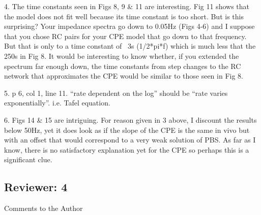 \documentclass[journal, a4paper]{IEEEtran}
\begin{document}
{    4. The time constants seen in Figs 8, 9 \& 11 are interesting. Fig 11 shows that the model does not fit well because its time constant is too short. But is this surprising? Your impedance spectra go down to 0.05Hz (Figs 4-6) and I suppose that you chose RC pairs for your CPE model that go down to that frequency. But that is only to a time constant of ~3s (1/2*pi*f) which is much less that the 250s in Fig 8. It would be interesting to know whether, if you extended the spectrum far enough down, the time constants from step changes to the RC network that approximates the CPE would be similar to those seen in Fig 8.

    5. p 6, col 1, line 11. ``rate dependent on the log'' should be ``rate varies exponentially''. i.e. Tafel equation.

    6. Figs 14 \& 15 are intriguing. For reason given in 3 above, I discount the results below 50Hz, yet it does look as if the slope of the CPE is the same in vivo but with an offset that would correspond to a very weak solution of PBS. As far as I know, there is no satisfactory explanation yet for the CPE so perhaps this is a significant clue.
}

\subsection*{Reviewer: 4}

Comments to the Author
\end{document}
